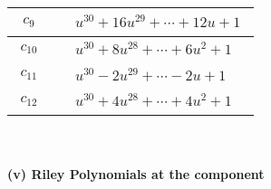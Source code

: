 \documentclass[1p]{elsarticle_modified}
\theoremstyle{definition}
\begin{document}
\begin{tabular}{m{50pt}|m{274pt}}
\hline $$\begin{aligned}c_{9}\end{aligned}$$&$\begin{aligned}
&u^{30}+16 u^{29}+\cdots+12 u+1
\end{aligned}$\\
\hline $$\begin{aligned}c_{10}\end{aligned}$$&$\begin{aligned}
&u^{30}+8 u^{28}+\cdots+6 u^2+1
\end{aligned}$\\
\hline $$\begin{aligned}c_{11}\end{aligned}$$&$\begin{aligned}
&u^{30}-2 u^{29}+\cdots-2 u+1
\end{aligned}$\\
\hline $$\begin{aligned}c_{12}\end{aligned}$$&$\begin{aligned}
&u^{30}+4 u^{28}+\cdots+4 u^2+1
\end{aligned}$\\
\hline
\end{tabular}\\~\\
\newpage\renewcommand{\arraystretch}{1}
\flushleft \textbf{(v) Riley Polynomials at the component}\newline \\
\end{document}
